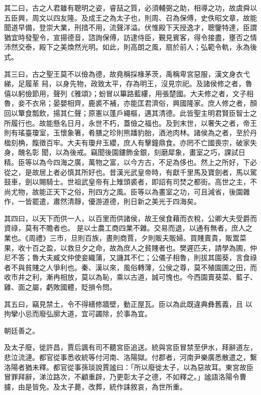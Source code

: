 \begin{pinyinscope}
 其二曰，古之人君雖有聰明之姿，睿喆之質，必須輔弼之助，相導之功，故虞舜以五臣興，周文以四友隆。及成王之為太子也，則周、召為保傅，史佚昭文章，故能聞道早備，登崇大業，刑措不用，流聲洋溢。伏惟殿下天授逸才，聰鑒特達，臣謂猶宜時發聖令，宣揚德音，諮詢保傅，訪逮侍臣，覲見賓客，得令接盡，壅否之情沛然交泰，殿下之美煥然光明。如此，則高朗之風，扇於前人；弘範令軌，永為後式。



 其三曰，古之聖王莫不以儉為德，故堯稱採椽茅茨，禹稱卑宮惡服，漢文身衣弋綈，足履革
 舄，以身先物，政致太平，存為明王，沒見宗祀。及諸侯修之者，魯僖以躬儉節用，聲列《雅頌》；蚡冒以篳路藍縷，用張楚國。大夫修之者，文子相魯，妾不衣帛；晏嬰相齊，鹿裘不補，亦能匡君濟俗，興國隆家。庶人修之者，顏回以簞食瓢飲，揚其仁聲；原憲以蓬戶繩樞，邁其清德。此皆聖主明君賢臣智士之所履行也。故能懸名日月，永世不朽，蓋儉之福也。及到末世，以奢失之者，帝王則有瑤臺瓊室，玉懷象箸，肴膳之珍則熊蹯豹胎，酒池肉林。諸侯為之者，至於丹楹刻桷，餼徵百牢。大夫有瓊弁玉纓，庶人有擊鐘鼎食。亦罔不亡國喪宗，破家失身，醜名彰
 聞，以為後戒。竊聞後園鏤飾金銀，刻磨犀象，畫室之巧，課試日精。臣等以為今四海之廣，萬物之富，以今方古，不足為侈也。然上之所好，下必從之，是故居上者必慎其所好也。昔漢光武皇帝時，有獻千里馬及寶劍者，馬以駕鼓車，劍以賜騎士。世祖武皇帝有上雉頭裘者，即詔有司焚之都街。高世之主，不尚尤物，故能正天下之俗，刑四方之風。臣等以為畫室之功，可且減省，後園雜作，一皆罷遣，肅然清靜，優游道德，則日新之美光于四海矣。



 其四曰，以天下而供一人，以百里而供諸侯，故王侯食藉而衣稅，公卿大夫受爵而資祿，莫有不贍者也。
 是以士農工商四業不雜。交易而退，以通有無者，庶人之業也。《周禮》三市，旦則百族，晝則商賈，夕則販夫販婦。買賤賣貴，販鬻菜果，收十百之盈，以救旦夕之命，故為庶人之貧賤者也。樊遲匹夫，請學為圃，仲尼不答；魯大夫臧文仲使妾織蒲，又譏其不仁；公儀子相魯，則拔其園葵，言食祿者不與貧賤之人爭利也。秦、漢以來，風俗轉薄，公侯之尊，莫不殖園圃之田，而收市井之利，漸冉相放，莫以為恥，乘以古道，誠可愧也。今西園賣葵菜、藍子、雞、面之屬，虧敗國體，貶損令問。



 其五曰，竊見禁土，令不得繕修牆壁，動正屋瓦。臣以為此既違典彝舊義，且
 以拘攣小忌而廢弘廓大道，宜可蠲除，於事為宜。



 朝廷善之。



 及太子廢，徙許昌，賈后諷有司不聽宮臣追送。統與宮臣冒禁至伊水，拜辭道左，悲泣流漣。都官從事悉收統等付河南、洛陽獄。付郡者，河南尹樂廣悉散遣之，繫洛陽者猶未釋。都官從事孫琰說賈謐曰：「所以廢徙太子，以為惡故耳。東宮故臣冒罪拜辭，涕泣路次，不顧重辟，乃更彰太子之德，不如釋之。」謐語洛陽令曹攄，由是皆免。及太子薨，改葬，統作誄敘哀，為世所重。




\end{pinyinscope}
